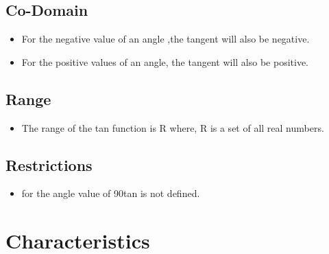 \documentclass[a4paper, 11pt]{article}
\begin{document}
 \subsection{Co-Domain}
 \begin{itemize}
  \item  For the negative value of an angle ,the tangent will also be negative. 
  \item  For the positive values of an angle, the tangent will also be positive.
\end{itemize}

 \subsection{Range}
 \begin{itemize}
     \item The range of the tan function is R where, R is a set of all real numbers.
 \end{itemize}
    
 \subsection{Restrictions} 
 \begin{itemize}
  \item  for the angle value of 90\degree  tan is not defined.  
\end{itemize}

\section{Characteristics}
\end{document}
